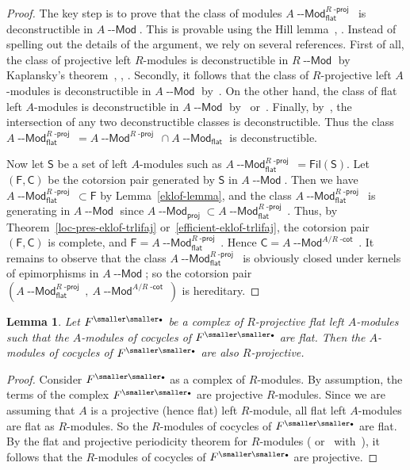 \documentclass[12pt,a4paper]{amsart}
\newcommand{\+}{\nobreakdash-}
\renewcommand{\:}{\colon}
\newcommand{\bu}{{\text{\smaller\smaller$\scriptstyle\bullet$}}}
\newcommand{\Modl}{{\operatorname{\mathsf{--Mod}}}}
\newcommand{\sC}{\mathsf C}
\newcommand{\sF}{\mathsf F}
\newcommand{\sS}{\mathsf S}
\newcommand{\Fil}{\mathsf{Fil}}
\newcommand{\proj}{\mathsf{proj}}
\renewcommand{\flat}{\mathsf{flat}}
\newcommand{\dcot}{{\operatorname{\mathsf{-cot}}}}
\newcommand{\dproj}{{\operatorname{\mathsf{-proj}}}}
\theoremstyle{plain}
\newtheorem{lem}[thm]{Lemma}
\theoremstyle{definition}
\begin{document}
\begin{proof}
 The key step is to prove that the class of modules
$A\Modl_\flat^{R\dproj}$ is deconstructible in $A\Modl$.
 This is provable using the Hill lemma~\cite[Theorem~7.10]{GT},
\cite[Theorem~2.1]{Sto-hill}.
 Instead of spelling out the details of the argument, we rely on
several references.
 First of all, the class of projective left $R$\+modules is
deconstructible in $R\Modl$ by Kaplansky's
theorem~\cite[Theorem~1]{Kap}, \cite[Lemma~7.12 and
Corollary~7.14]{GT}, \cite[Proposition~2.9(1)]{Sto-hill}.
 Secondly, it follows that the class of $R$\+projective left
$A$\+modules is deconstructible in $A\Modl$
by~\cite[Proposition~2.3]{Pctrl}.
 On the other hand, the class of flat left $A$\+modules is
deconstructible in $A\Modl$ by~\cite[Lemma~1 and Proposition~2]{BBE}
or~\cite[Lemma~6.17]{GT}.
 Finally, by~\cite[Proposition~2.9(2)]{Sto-hill}, the intersection of
any two deconstructible classes is deconstructible.
 Thus the class $A\Modl_\flat^{R\dproj}=A\Modl^{R\dproj}\cap
A\Modl_\flat$ is deconstructible.

 Now let $\sS$ be a set of left $A$\+modules such as
$A\Modl^{R\dproj}_\flat=\Fil(\sS)$.
 Let $(\sF,\sC)$ be the cotorsion pair generated by $\sS$ in $A\Modl$.
 Then we have $A\Modl_\flat^{R\dproj}\subset\sF$ by
Lemma~\ref{eklof-lemma}, and the class $A\Modl_\flat^{R\dproj}$ is
generating in $A\Modl$ since $A\Modl_\proj\subset
A\Modl_\flat^{R\dproj}$.
 Thus, by Theorem~\ref{loc-pres-eklof-trlifaj}
or~\ref{efficient-eklof-trlifaj}, the cotorsion pair $(\sF,\sC)$
is complete, and $\sF=A\Modl_\flat^{R\dproj}$.
 Hence $\sC=A\Modl^{A/R\dcot}$.
 It remains to observe that the class $A\Modl_\flat^{R\dproj}$ is
obviously closed under kernels of epimorphisms in $A\Modl$; so
the cotorsion pair $(A\Modl_\flat^{R\dproj},\>A\Modl^{A/R\dcot})$
is hereditary.
\end{proof}

\begin{lem} \label{R-projective-A-flat-periodicity-lemma}
 Let $F^\bu$ be a complex of $R$\+projective flat left $A$\+modules
such that the $A$\+modules of cocycles of $F^\bu$ are flat.
 Then the $A$\+modules of cocycles of $F^\bu$ are also
$R$\+projective.
\end{lem}

\begin{proof}
 Consider $F^\bu$ as a complex of $R$\+modules.
 By assumption, the terms of the complex $F^\bu$ are projective
$R$\+modules.
 Since we are assuming that $A$ is a projective (hence flat) left
$R$\+module, all flat left $A$\+modules are flat as $R$\+modules.
 So the $R$\+modules of cocycles of $F^\bu$ are flat.
 By the flat and projective periodicity theorem for
$R$\+modules (\cite[Remark~2.15]{Neem} or~\cite[Theorem~2.5]{BG}
with~\cite[Proposition~7.6]{CH}), it follows that the $R$\+modules
of cocycles of $F^\bu$ are projective.
\end{proof}
\end{document}
